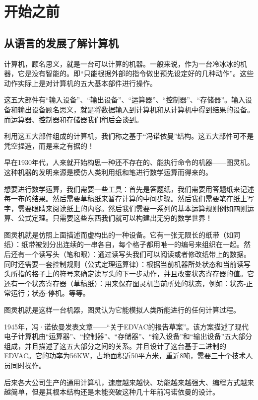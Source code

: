 \chapter{开始之前}

\section{从语言的发展了解计算机}

计算机，顾名思义，就是一台可以计算的机器。一般来说，作为一台冷冰冰的机器，它是没有智能的。即“只能根据外部的指令做出预先设定好的几种动作”。这些动作实际上是对计算机的五大基本部件进行操作。

这五大部件有“输入设备”、“输出设备”、“运算器”、“控制器”、“存储器”。输入设备和输出设备顾名思义，就是将数据输入到计算机和从计算机中得到结果的设备。而运算器、控制器和存储器我们稍后会谈到。

利用这五大部件组成的计算机，我们称之基于“冯诺依曼”结构。这五大部件可不是凭空捏造，而是来之有据的！

早在1930年代，人来就开始构思一种还不存在的、能执行命令的机器——图灵机。这种机器的发明来源是模仿人类利用纸和笔进行数学运算而得来的。

想要进行数学运算，我们需要一些工具：首先是答题纸，我们需要用答题纸来记述每一布的结果。然后需要草稿纸来暂存计算的中间步骤。然后我们需要笔在纸上写字，需要眼睛来阅读纸上的内容。然后我们需要一系列的基本运算规则例如四则运算、公式定理。只需要这些东西我们就可以构建出无穷的数学世界！

图灵机就是仿照上面描述而虚构出的一种设备。它有一张无限长的纸带（如同纸）：纸带被划分出连续的一串各自，每个格子都用唯一的编号来组织在一起。然后还有一个读写头（笔和眼）：通过读写头我们可以阅读或者修改纸带上的数据。同时还需要一套控制规则（公式定理运算律）：根据当前机器所处状态和当前读写头所指的格子上的符号来确定读写头的下一步动作，并且改变状态寄存器的值。它还有一个状态寄存器（草稿纸）：用来保存图灵机当前所处的状态，例如：状态-正常运行；状态-停机。等等。

图灵机就是这样一台机器，图灵认为它能模拟人类所能进行的任何计算过程。

1945年，冯·诺依曼发表文章——“关于EDVAC的报告草案”。该方案描述了现代电子计算机由“运算器”、“控制器”、“存储器”、“输入设备”和“输出设备”五大部分组成，并且描述了这五大部分之间的关系。并且设计了这台基于二进制的EDVAC。它的功率为56KW，占地面积近50平方米，重近8吨，需要三十个技术人员同时操作。

后来各大公司生产的通用计算机，速度越来越快、功能越来越强大、编程方式越来越简单，但是其根本结构还是未能突破这种几十年前冯诺依曼的设计。

